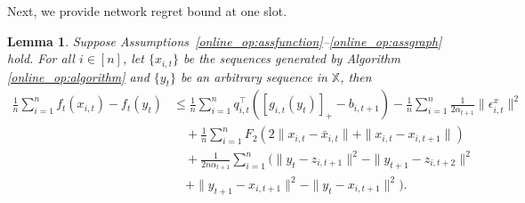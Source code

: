 \documentclass[12pt,draftcls,onecolumn]{IEEEtran}%
\newtheorem{lemma}{Lemma}
\begin{document}
Next,  we provide  network regret bound at one slot.
\begin{lemma}\label{online_op:lemma_regretdelta}
Suppose Assumptions~\ref{online_op:assfunction}--\ref{online_op:assgraph} hold. For all $i\in[n]$, let $\{x_{i,t}\}$ be the sequences generated by Algorithm \ref{online_op:algorithm} and $\{y_{t}\}$ be an arbitrary sequence in $\mathbb{X}$, then
\begin{align}\label{online_op:lemma_regretdeltaequ}
\frac{1}{n}\sum_{i=1}^nf_{t}(x_{i,t})
-f_{t}(y_t)
&\le \frac{1}{n}\sum_{i=1}^nq_{i,t}^\top ([g_{i,t}(y_{t})]_+-b_{i,t+1})
-\frac{1}{n}\sum_{i=1}^n\frac{1}{2\alpha_{t+1}}\|\epsilon^x_{i,t}\|^2\nonumber\\
&\quad+\frac{1}{n}\sum_{i=1}^nF_2(2\|x_{i,t}-\bar{x}_{i,t}\|+\|x_{i,t}-x_{i,t+1}\|)\nonumber\\
&\quad+\frac{1}{ 2n\alpha_{t+1}}\sum_{i=1}^n(\|y_t-z_{i,t+1}\|^2-\|y_{t+1}-z_{i,t+2}\|^2\nonumber\\
&\quad+\|y_{t+1}-x_{i,t+1}\|^2-\|y_t-x_{i,t+1}\|^2).
\end{align}
\end{lemma}
\end{document}
